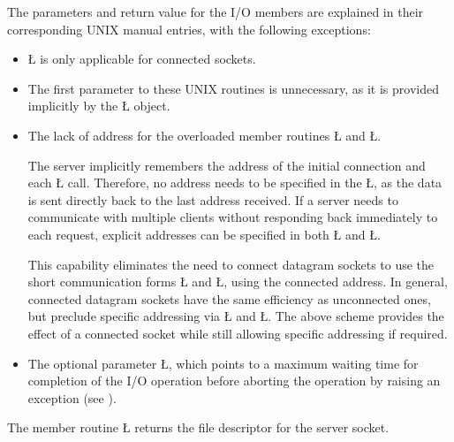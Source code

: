 \documentclass[openright,twoside]{report}
\begin{document}
The parameters and return value for the I/O members are explained in their corresponding UNIX manual entries, with the following exceptions:
\begin{itemize}
\item
\LGinlinetrue\LGbegin\lgrinde\L{}\endlgrinde\LGend{} is only applicable for connected sockets.
\item
The first parameter to these UNIX routines is unnecessary, as it is provided implicitly by the \LGinlinetrue\LGbegin\lgrinde\L{}\endlgrinde\LGend{} object.
\item
The lack of address for the overloaded member routines \LGinlinetrue\LGbegin\lgrinde\L{}\endlgrinde\LGend{} and \LGinlinetrue\LGbegin\lgrinde\L{}\endlgrinde\LGend{}.

The server implicitly remembers the address of the initial connection and each \LGinlinetrue\LGbegin\lgrinde\L{}\endlgrinde\LGend{} call.
Therefore, no address needs to be specified in the \LGinlinetrue\LGbegin\lgrinde\L{}\endlgrinde\LGend{}, as the data is sent directly back to the last address received.
If a server needs to communicate with multiple clients without responding back immediately to each request, explicit addresses can be specified in both \LGinlinetrue\LGbegin\lgrinde\L{}\endlgrinde\LGend{} and \LGinlinetrue\LGbegin\lgrinde\L{}\endlgrinde\LGend{}.

This capability eliminates the need to connect datagram sockets to use the short communication forms \LGinlinetrue\LGbegin\lgrinde\L{}\endlgrinde\LGend{} and \LGinlinetrue\LGbegin\lgrinde\L{}\endlgrinde\LGend{}, using the connected address.
In general, connected datagram sockets have the same efficiency as unconnected ones, but preclude specific addressing via \LGinlinetrue\LGbegin\lgrinde\L{}\endlgrinde\LGend{} and \LGinlinetrue\LGbegin\lgrinde\L{}\endlgrinde\LGend{}.
The above scheme provides the effect of a connected socket while still allowing specific addressing if required.
\item
The optional parameter \LGinlinetrue\LGbegin\lgrinde\L{}\endlgrinde\LGend{}, which points to a maximum waiting time for completion of the I/O operation before aborting the operation by raising an exception (see ).
\end{itemize}

The member routine \LGinlinetrue\LGbegin\lgrinde\L{}\endlgrinde\LGend{} returns the file descriptor for the server socket.
\end{document}
